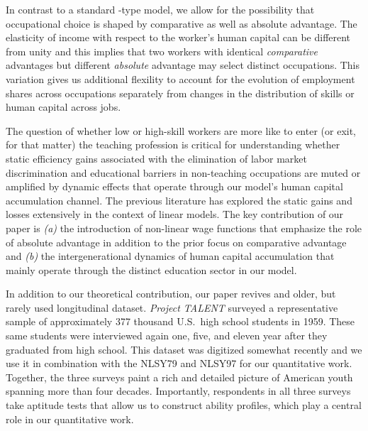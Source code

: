 \documentclass[onehalfspacing,11pt]{article}
\begin{document}
In contrast to a standard \cite{Roy:1951}-type model, we allow for the possibility that occupational choice is shaped by comparative as well as absolute advantage. The elasticity of income with respect to the worker's human capital can be different from unity and this implies that two workers with identical {\it comparative} advantages but different {\it absolute} advantage may select distinct occupations. This variation gives us additional flexility to account for the evolution of employment shares across occupations separately from changes in the distribution of skills or human capital across jobs.

The question of whether low or high-skill workers are more like to enter (or exit, for that matter) the teaching profession is critical for understanding whether static efficiency gains associated with the elimination of labor market discrimination and educational barriers in non-teaching occupations are muted or amplified by dynamic effects that operate through our model's human capital accumulation channel. The previous literature has explored the static gains and losses extensively in the context of linear models. The key contribution of our paper is {\it (a)} the introduction of non-linear wage functions that emphasize the role of absolute advantage in addition to the prior focus on comparative advantage and {\it (b)} the intergenerational dynamics of human capital accumulation that mainly operate through the distinct education sector in our model.

In addition to our theoretical contribution, our paper revives and older, but rarely used longitudinal dataset. {\it Project TALENT} surveyed a representative sample of approximately 377 thousand U.S.~high school students in 1959. These same students were interviewed again one, five, and eleven year after they graduated from high school. This dataset was digitized somewhat recently and we use it in combination with the NLSY79 and NLSY97 for our quantitative work. Together, the three surveys paint a rich and detailed picture of American youth spanning more than four decades. Importantly, respondents in all three surveys take aptitude tests that allow us to construct ability profiles, which play a central role in our quantitative work.

\end{document}
